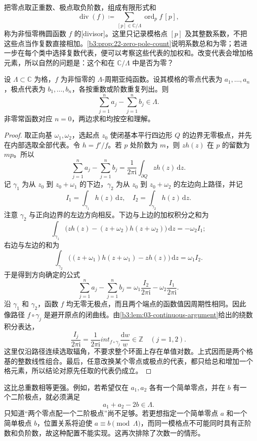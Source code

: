 把零点取正重数、极点取负阶数，组成有限形式和
\[
 \operatorname{div}(f)\coloneqq
 \sum_{[p]\in\mathbb C/\Lambda}\operatorname{ord}_p f\,[p],
\]
称为非恒零椭圆函数 \(f\) 的[divisor]。这里只记录模格点 \([p]\) 及其整数系数，不把这些点当作复数直接相加。\cref{b3:prop:22-zero-pole-count}说明系数总和为零；若进一步在每个类中选择复数代表，便可以考察这些代表的加权和。改变代表会增加格元素，所以自然的问题是：这个和在 \(\mathbb C/\Lambda\) 中是否为零？

\begin{proposition}\label{b3:prop:22-divisor-necessary}
设 \(\Lambda\subset\mathbb C\) 为格，\(f\) 为非恒零的 \(\Lambda\)-周期亚纯函数。设其模格的零点代表为 \(a_1,\ldots,a_n\)，极点代表为 \(b_1,\ldots,b_n\)，各按重数或阶数重复列出。则
\[
 \sum_{j=1}^n a_j-\sum_{j=1}^n b_j\in\Lambda.
\]
非零常函数对应 \(n=0\)，两边求和均按空和理解。
\end{proposition}
\begin{proof}
取正向基 \(\omega_1,\omega_2\)，选起点 \(z_0\) 使闭基本平行四边形 \(Q\) 的边界无零极点，并先在内部选取全部代表。令 \(h=f'/f\)。若 \(p\) 处阶数为 \(m\)，则 \(zh(z)\) 在 \(p\) 的留数为 \(mp\)。所以
\[
 \sum_{j=1}^n a_j-\sum_{j=1}^n b_j
 =\frac1{2\pi\mathrm{i}}\int_{\partial Q}zh(z)\,\mathrm{d}z.
\]
记 \(\gamma_1\) 为从 \(z_0\) 到 \(z_0+\omega_1\) 的下边，\(\gamma_2\) 为从 \(z_0\) 到 \(z_0+\omega_2\) 的左边向上路径，并记
\[
 I_1=\int_{\gamma_1}h(z)\,\mathrm{d}z,
 \quad I_2=\int_{\gamma_2}h(z)\,\mathrm{d}z.
\]
注意 \(\gamma_2\) 与正向边界的左边方向相反。下边与上边的加权积分之和为
\[
 \int_{\gamma_1}\bigl(zh(z)-(z+\omega_2)h(z+\omega_2)\bigr)\,\mathrm{d}z
 =-\omega_2I_1;
\]
右边与左边的和为
\[
 \int_{\gamma_2}\bigl((z+\omega_1)h(z+\omega_1)-zh(z)\bigr)\,\mathrm{d}z
 =\omega_1I_2.
\]
于是得到方向确定的公式
\[
 \sum_{j=1}^n a_j-\sum_{j=1}^n b_j
 =\omega_1\frac{I_2}{2\pi\mathrm{i}}
  -\omega_2\frac{I_1}{2\pi\mathrm{i}}.
\]
沿 \(\gamma_1\) 和 \(\gamma_2\)，函数 \(f\) 均无零无极点，而且两个端点的函数值因周期性相同。因此像路径 \(f\circ\gamma_j\) 是避开原点的闭曲线。由\cref{b3:lem:03-continuous-argument}给出的绕数积分表达，
\[
 \frac{I_j}{2\pi\mathrm{i}}
 =\frac1{2\pi\mathrm{i}}int_{f\circ\gamma_j}\frac{\mathrm{d}w}{w}
 \in\mathbb Z\quad(j=1,2).
\]
这里仅沿路径连续选取辐角，不要求整个环面上存在单值对数。上式因而是两个格基的整数线性组合。最后，任意改换某个零点或极点的代表，都只给总和增加一个格元素，所以结论对原先任取的代表仍成立。
\end{proof}

这比总重数相等更强。例如，若希望仅在 \(a_1,a_2\) 各有一个简单零点，并在 \(b\) 有一个二阶极点，就必须满足
\[
 a_1+a_2-2b\in\Lambda.
\]
只知道“两个零点配一个二阶极点”尚不足够。若更想指定一个简单零点 \(a\) 和一个简单极点 \(b\)，位置关系将迫使 \(a\equiv b\pmod\Lambda\)，而同一模格点不可能同时具有正阶数和负阶数，故这种配置不能实现。这再次排除了次数一的情形。


